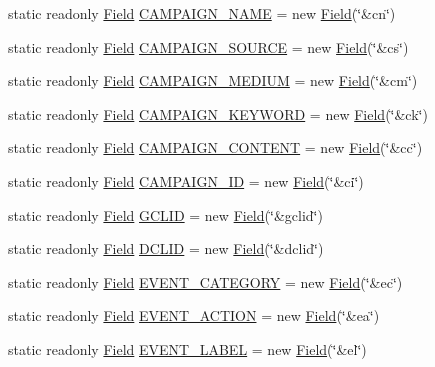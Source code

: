 \begin{DoxyCompactItemize}
\item 
static readonly \hyperlink{class_field}{Field} \hyperlink{class_fields_afaee625181295feff111674fe1ddba89}{C\+A\+M\+P\+A\+I\+G\+N\+\_\+\+N\+A\+ME} = new \hyperlink{class_field}{Field}(\char`\"{}\&cn\char`\"{})
\item 
static readonly \hyperlink{class_field}{Field} \hyperlink{class_fields_a5f3e7990cb5e4c4e051b67eb0b3bfa33}{C\+A\+M\+P\+A\+I\+G\+N\+\_\+\+S\+O\+U\+R\+CE} = new \hyperlink{class_field}{Field}(\char`\"{}\&cs\char`\"{})
\item 
static readonly \hyperlink{class_field}{Field} \hyperlink{class_fields_ae0d5e9aae5f2ded1b9c09d26755a80fa}{C\+A\+M\+P\+A\+I\+G\+N\+\_\+\+M\+E\+D\+I\+UM} = new \hyperlink{class_field}{Field}(\char`\"{}\&cm\char`\"{})
\item 
static readonly \hyperlink{class_field}{Field} \hyperlink{class_fields_ac0d76a5b65a53cef79fb4a98447919aa}{C\+A\+M\+P\+A\+I\+G\+N\+\_\+\+K\+E\+Y\+W\+O\+RD} = new \hyperlink{class_field}{Field}(\char`\"{}\&ck\char`\"{})
\item 
static readonly \hyperlink{class_field}{Field} \hyperlink{class_fields_ad26d0e6ce2639f4f6efc26a14f2666a0}{C\+A\+M\+P\+A\+I\+G\+N\+\_\+\+C\+O\+N\+T\+E\+NT} = new \hyperlink{class_field}{Field}(\char`\"{}\&cc\char`\"{})
\item 
static readonly \hyperlink{class_field}{Field} \hyperlink{class_fields_aaf7969c03e2a3ecb9ca6c18dce7c8697}{C\+A\+M\+P\+A\+I\+G\+N\+\_\+\+ID} = new \hyperlink{class_field}{Field}(\char`\"{}\&ci\char`\"{})
\item 
static readonly \hyperlink{class_field}{Field} \hyperlink{class_fields_a07ca7b46e9a0c6d7022e8c9da86fec22}{G\+C\+L\+ID} = new \hyperlink{class_field}{Field}(\char`\"{}\&gclid\char`\"{})
\item 
static readonly \hyperlink{class_field}{Field} \hyperlink{class_fields_aed044584d41dcac3215512ed5e9c3838}{D\+C\+L\+ID} = new \hyperlink{class_field}{Field}(\char`\"{}\&dclid\char`\"{})
\item 
static readonly \hyperlink{class_field}{Field} \hyperlink{class_fields_a8467b8ebb804d87bd56a6a00856a5115}{E\+V\+E\+N\+T\+\_\+\+C\+A\+T\+E\+G\+O\+RY} = new \hyperlink{class_field}{Field}(\char`\"{}\&ec\char`\"{})
\item 
static readonly \hyperlink{class_field}{Field} \hyperlink{class_fields_a223426f01058c9382d76ab4ab22ccaf6}{E\+V\+E\+N\+T\+\_\+\+A\+C\+T\+I\+ON} = new \hyperlink{class_field}{Field}(\char`\"{}\&ea\char`\"{})
\item 
static readonly \hyperlink{class_field}{Field} \hyperlink{class_fields_a74dd30129641527a65c0cf9438804d6c}{E\+V\+E\+N\+T\+\_\+\+L\+A\+B\+EL} = new \hyperlink{class_field}{Field}(\char`\"{}\&el\char`\"{})

\end{DoxyCompactItemize}
